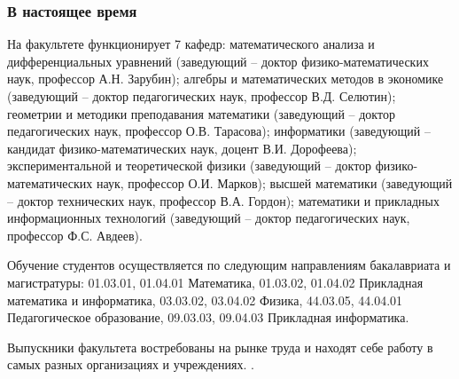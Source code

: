 \documentclass[pdf,hyperref={unicode}, aspectratio=43, serif,11pt]{beamer}
\begin{document}

\begin{frame}
\frametitle{В настоящее время}
\tiny{

На факультете функционирует 7 кафедр: математического анализа и дифференциальных уравнений (заведующий – доктор физико-математических наук, профессор А.Н. Зарубин); алгебры и математических методов в экономике (заведующий – доктор педагогических наук, профессор В.Д. Селютин); геометрии и методики преподавания математики (заведующий – доктор педагогических наук, профессор О.В. Тарасова); информатики (заведующий – кандидат физико-математических наук, доцент В.И. Дорофеева); экспериментальной и теоретической физики (заведующий – доктор физико-математических наук, профессор О.И. Марков); высшей математики (заведующий – доктор технических наук, профессор В.А. Гордон); математики и прикладных информационных технологий (заведующий – доктор педагогических наук, профессор Ф.С. Авдеев).

Обучение студентов осуществляется по следующим направлениям бакалавриата и магистратуры: 01.03.01, 01.04.01 Математика, 01.03.02, 01.04.02 Прикладная математика и информатика, 03.03.02, 03.04.02 Физика, 44.03.05, 44.04.01 Педагогическое образование, 09.03.03, 09.04.03 Прикладная информатика.

Выпускники факультета востребованы на рынке труда и находят себе работу в самых разных организациях и учреждениях.
.}
\begin{figure}[!h]
\centering
{}
\end{figure}

\end{frame}
\end{document}
